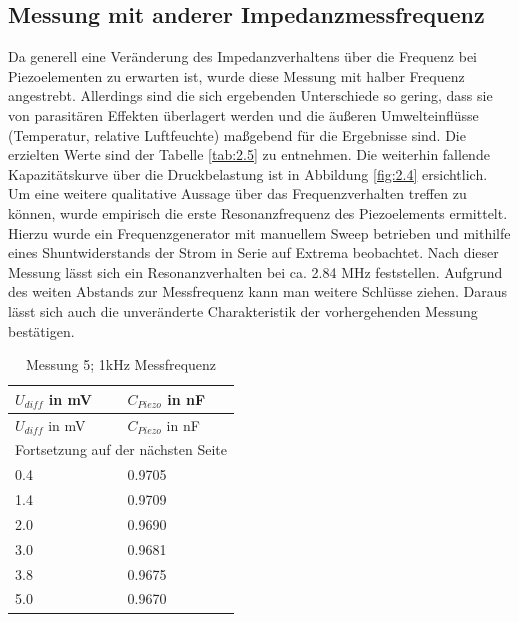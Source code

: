 \documentclass[11pt]{scrreprt} %
\begin{document}
\newpage
\subsection{Messung mit anderer Impedanzmessfrequenz}
Da generell eine Veränderung des Impedanzverhaltens über die Frequenz bei Piezoelementen zu erwarten ist, wurde diese Messung mit halber Frequenz angestrebt. Allerdings sind die sich ergebenden Unterschiede so gering, dass sie von parasitären Effekten überlagert werden und die äußeren Umwelteinflüsse (Temperatur, relative Luftfeuchte) maßgebend für die Ergebnisse sind. Die erzielten Werte sind der Tabelle \vref{tab:2.5} zu entnehmen. Die weiterhin fallende Kapazitätskurve über die Druckbelastung ist in Abbildung \vref{fig:2.4} ersichtlich.\\
Um eine weitere qualitative Aussage über das Frequenzverhalten treffen zu können, wurde empirisch die erste Resonanzfrequenz des Piezoelements ermittelt. Hierzu wurde ein Frequenzgenerator mit manuellem Sweep betrieben und mithilfe eines Shuntwiderstands der Strom in Serie auf Extrema beobachtet. Nach dieser Messung lässt sich ein Resonanzverhalten bei ca. 2.84 MHz feststellen. Aufgrund des weiten Abstands zur Messfrequenz kann man weitere Schlüsse ziehen. Daraus lässt sich auch die unveränderte Charakteristik der vorhergehenden Messung bestätigen.

\setlongtables
\begin{longtable}{| l | l |}
\caption{Messung 5; 1kHz Messfrequenz}\\
\hline
$U_{diff}$ in mV&$C_{Piezo}$ in nF\\
\hline
\endfirsthead
\hline
$U_{diff}$ in mV&$C_{Piezo}$ in nF\\
\hline
\endhead
\hline
\multicolumn{2}{|c|}{Fortsetzung auf der nächsten Seite}\\
\hline
\endfoot
\hline \hline
\endlastfoot
\hline
\label{tab:2.5}%
0.4&0.9705\\
1.4&0.9709\\
2.0&0.9690\\
3.0&0.9681\\
3.8&0.9675\\
5.0&0.9670\\
\end{longtable}
\end{document}
